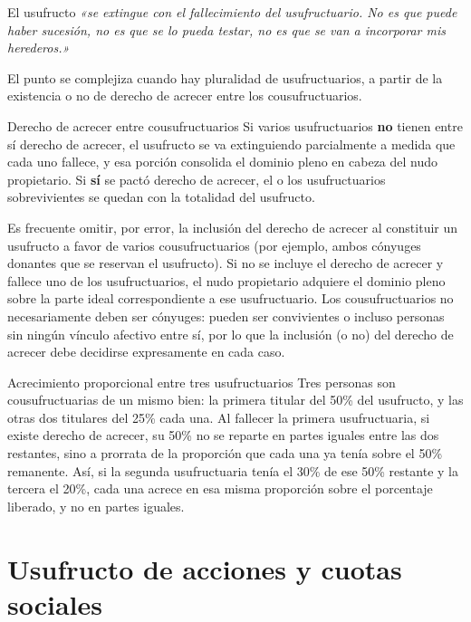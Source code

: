 \documentclass[12pt,oneside]{book}
\begin{document}
El usufructo \textit{«se extingue con el fallecimiento del usufructuario. No es que puede haber sucesión, no es que se lo pueda testar, no es que se van a incorporar mis herederos.»}

El punto se complejiza cuando hay pluralidad de usufructuarios, a partir de la existencia o no de derecho de acrecer entre los cousufructuarios.

\begin{definition}{Derecho de acrecer entre cousufructuarios}
Si varios usufructuarios \textbf{no} tienen entre sí derecho de acrecer, el usufructo se va extinguiendo parcialmente a medida que cada uno fallece, y esa porción consolida el dominio pleno en cabeza del nudo propietario. Si \textbf{sí} se pactó derecho de acrecer, el o los usufructuarios sobrevivientes se quedan con la totalidad del usufructo.
\end{definition}

\begin{important}
Es frecuente omitir, por error, la inclusión del derecho de acrecer al constituir un usufructo a favor de varios cousufructuarios (por ejemplo, ambos cónyuges donantes que se reservan el usufructo). Si no se incluye el derecho de acrecer y fallece uno de los usufructuarios, el nudo propietario adquiere el dominio pleno sobre la parte ideal correspondiente a ese usufructuario. Los cousufructuarios no necesariamente deben ser cónyuges: pueden ser convivientes o incluso personas sin ningún vínculo afectivo entre sí, por lo que la inclusión (o no) del derecho de acrecer debe decidirse expresamente en cada caso.
\end{important}

\begin{example}{Acrecimiento proporcional entre tres usufructuarios}
Tres personas son cousufructuarias de un mismo bien: la primera titular del 50\% del usufructo, y las otras dos titulares del 25\% cada una. Al fallecer la primera usufructuaria, si existe derecho de acrecer, su 50\% no se reparte en partes iguales entre las dos restantes, sino a prorrata de la proporción que cada una ya tenía sobre el 50\% remanente. Así, si la segunda usufructuaria tenía el 30\% de ese 50\% restante y la tercera el 20\%, cada una acrece en esa misma proporción sobre el porcentaje liberado, y no en partes iguales.
\end{example}

\section{Usufructo de acciones y cuotas sociales}
\end{document}
